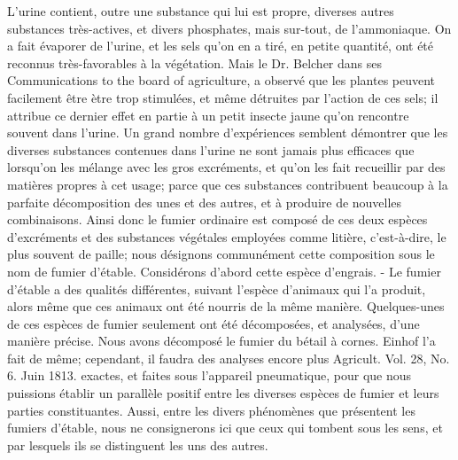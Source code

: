 L'urine contient, outre une substance qui lui est propre, diverses autres substances très-actives, et divers phosphates, mais sur-tout, de l'ammoniaque. On a fait évaporer de l'urine, et les sels qu'on en a tiré, en petite quantité, ont été reconnus très-favorables à la végétation. Mais le Dr. Belcher dans ses Communications to the board of agriculture, a observé que les plantes peuvent facilement être\setcounter{page}{233} ètre trop stimulées, et même détruites par l'action de ces sels; il attribue ce dernier effet en partie à un petit insecte jaune qu'on rencontre souvent dans l'urine. Un grand nombre d'expériences semblent démontrer que les diverses substances contenues dans l'urine ne sont jamais plus efficaces que lorsqu'on les mélange avec les gros excréments, et qu'on les fait recueillir par des matières propres à cet usage; parce que ces substances contribuent beaucoup à la parfaite décomposition des unes et des autres, et à produire de nouvelles combinaisons.
Ainsi donc le fumier ordinaire est composé de ces deux espèces d'excréments et des substances végétales employées comme litière, c'est-à-dire, le plus souvent de paille; nous désignons communément cette composition sous le nom de fumier d'étable. Considérons d'abord cette espèce d'engrais.
- Le fumier d'étable a des qualités différentes, suivant l'espèce d'animaux qui l'a produit, alors même que ces animaux ont été nourris de la même manière. Quelques-unes de ces espèces de fumier seulement ont été décomposées, et analysées, d'une manière précise. Nous avons décomposé le fumier du bétail à cornes. Einhof l'a fait de même; cependant, il faudra des analyses encore plus Agricult. Vol. 28, No. 6. Juin 1813.\setcounter{page}{234} exactes, et faites sous l’appareil pneumatique, pour que nous puissions établir un parallèle positif entre les diverses espèces de fumier et leurs parties constituantes. Aussi, entre les divers phénomènes que présentent les fumiers d’étable, nous ne consignerons ici que ceux qui tombent sous les sens, et par lesquels ils se distinguent les uns des autres.

